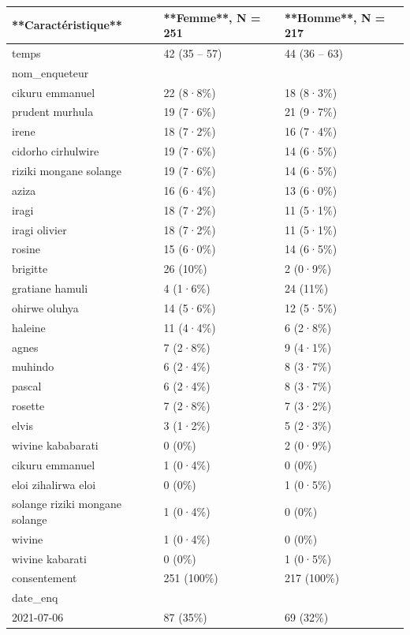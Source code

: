 \documentclass[
]{book}
\begin{document}
\begin{tabular}{l|l|l}
\hline
**Caractéristique** & **Femme**, N = 251 & **Homme**, N = 217\\
\hline
temps & 42 (35 – 57) & 44 (36 – 63)\\
\hline
nom\_enqueteur &  & \\
\hline
cikuru emmanuel & 22 (8·8\%) & 18 (8·3\%)\\
\hline
prudent murhula & 19 (7·6\%) & 21 (9·7\%)\\
\hline
irene & 18 (7·2\%) & 16 (7·4\%)\\
\hline
cidorho cirhulwire & 19 (7·6\%) & 14 (6·5\%)\\
\hline
riziki mongane solange & 19 (7·6\%) & 14 (6·5\%)\\
\hline
aziza & 16 (6·4\%) & 13 (6·0\%)\\
\hline
iragi & 18 (7·2\%) & 11 (5·1\%)\\
\hline
iragi olivier & 18 (7·2\%) & 11 (5·1\%)\\
\hline
rosine & 15 (6·0\%) & 14 (6·5\%)\\
\hline
brigitte & 26 (10\%) & 2 (0·9\%)\\
\hline
gratiane hamuli & 4 (1·6\%) & 24 (11\%)\\
\hline
ohirwe oluhya & 14 (5·6\%) & 12 (5·5\%)\\
\hline
haleine & 11 (4·4\%) & 6 (2·8\%)\\
\hline
agnes & 7 (2·8\%) & 9 (4·1\%)\\
\hline
muhindo & 6 (2·4\%) & 8 (3·7\%)\\
\hline
pascal & 6 (2·4\%) & 8 (3·7\%)\\
\hline
rosette & 7 (2·8\%) & 7 (3·2\%)\\
\hline
elvis & 3 (1·2\%) & 5 (2·3\%)\\
\hline
wivine kababarati & 0 (0\%) & 2 (0·9\%)\\
\hline
cikuru emmanuel & 1 (0·4\%) & 0 (0\%)\\
\hline
eloi zihalirwa eloi & 0 (0\%) & 1 (0·5\%)\\
\hline
solange riziki mongane solange & 1 (0·4\%) & 0 (0\%)\\
\hline
wivine & 1 (0·4\%) & 0 (0\%)\\
\hline
wivine kabarati & 0 (0\%) & 1 (0·5\%)\\
\hline
consentement & 251 (100\%) & 217 (100\%)\\
\hline
date\_enq &  & \\
\hline
2021-07-06 & 87 (35\%) & 69 (32\%)\\

\end{tabular}
\end{document}
